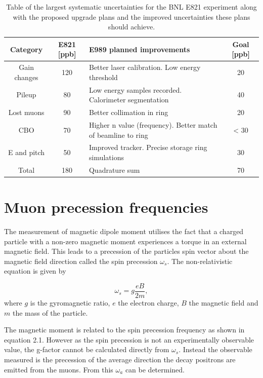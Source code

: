 \begin{table}[h!]
\begin{center}
 \begin{tabular}{||c | c | m{5cm} | c||} 
 \hline
 Category & E821 [ppb] & E989 planned improvements & Goal [ppb]\\ [0.5ex] 
 \hline\hline
 Gain changes & 120 & Better laser calibration. Low energy threshold & 20\\ 
 \hline
 Pileup & 80 & Low energy samples recorded. Calorimeter segmentation & 40 \\
 \hline
 Lost muons & 90 & Better collimation in ring & 20 \\
 \hline
 CBO & 70 & Higher n value (frequency). Better match of beamline to ring & < 30 \\
 \hline
 E and pitch & 50 & Improved tracker. Precise storage ring simulations & 30 \\ 
 \hline
 Total & 180 & Quadrature sum & 70  \\ [1ex] 
 \hline
\end{tabular}
\caption{Table of the largest systematic uncertainties for the BNL E821 experiment along with the proposed upgrade plans and the improved uncertainties these plans should achieve\cite{Reference29}.}
\label{table:1}
\end{center}
\end{table}

\section{Muon precession frequencies}

The measurement of magnetic dipole moment utilises the fact that a charged particle with a non-zero magnetic moment experiences a torque in an external magnetic field. This leads to a precession of the particles spin vector about the magnetic field direction called the spin precession $\omega_{s}$. The non-relativistic equation is given by

\begin{equation}
\omega_{s} = g\frac{eB}{2m},
\end{equation}
where $g$ is the gyromagnetic ratio, $e$ the electron charge, $B$ the magnetic field and $m$ the mass of the particle.

The magnetic moment is related to the spin precession frequency as shown in equation 2.1. However as the spin precession is not an experimentally observable value, the g-factor cannot be calculated directly from $\omega_{s}$. Instead the observable measured is the precession of the average direction the decay positrons are emitted from the muons. From this $\omega_{a}$ can be determined.

